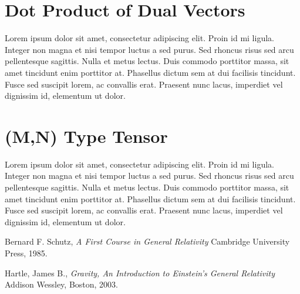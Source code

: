 \documentclass[natbib]{muthesis}
\begin{document}
  \section{Dot Product of Dual Vectors}
  Lorem ipsum dolor sit amet, consectetur adipiscing elit. Proin id mi ligula. Integer non magna et nisi tempor luctus a sed purus. Sed rhoncus risus sed arcu pellentesque sagittis. Nulla et metus lectus. Duis commodo porttitor massa, sit amet tincidunt enim porttitor at. Phasellus dictum sem at dui facilisis tincidunt. Fusce sed suscipit lorem, ac convallis erat. Praesent nunc lacus, imperdiet vel dignissim id, elementum ut dolor.

  \section{(M,N) Type Tensor}
  Lorem ipsum dolor sit amet, consectetur adipiscing elit. Proin id mi ligula. Integer non magna et nisi tempor luctus a sed purus. Sed rhoncus risus sed arcu pellentesque sagittis. Nulla et metus lectus. Duis commodo porttitor massa, sit amet tincidunt enim porttitor at. Phasellus dictum sem at dui facilisis tincidunt. Fusce sed suscipit lorem, ac convallis erat. Praesent nunc lacus, imperdiet vel dignissim id, elementum ut dolor.

  \begin{thebibliography}{1}

    Bernard F. Schutz, {\em A First Course in General Relativity} Cambridge University Press, 1985.

   Hartle, James B., {\em Gravity, An Introduction to Einstein’s General Relativity} Addison Wessley, Boston, 2003.

  \end{thebibliography}

  \biography
\end{document}
